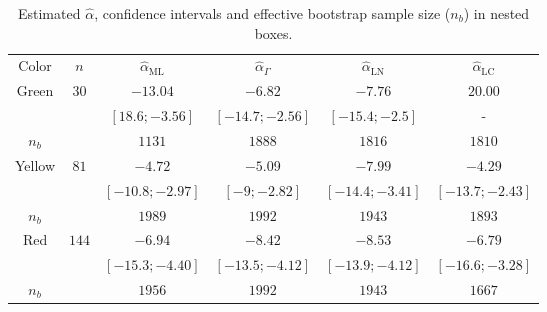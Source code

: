 \documentclass[twocolumn]{svjour3}
\begin{document}
\begin{table}[hbt]
\centering
\caption{Estimated $\widehat{\alpha}$, confidence intervals and effective bootstrap sample size ($n_b$) in nested boxes.}\label{ResultadosCorner} 
\begin{tabular}{c*5{c}}
	\toprule
	Color       &  $n$    &  $\widehat{\alpha}_{\text{{ML}}}$    &  $\widehat{\alpha}_{\Gamma}$  &  $\widehat{\alpha}_{\text{{LN}}}$ &  $\widehat{\alpha}_{\text{{LC}}}$\\
	\cmidrule(lr){1-6}
	Green       & $30$  & $-13.04$  & $-6.82$  & $-7.76$     &  $20.00$  \\
	&                   & $[18.6;-3.56]$ & $[-14.7;-2.56]$  & $[-15.4;-2.5]$ & -\\
	$n_{b}$    	&       &  $1131$         & $1888$            &  $1816$          &   $1810$       \\ \midrule
	Yellow     & $81$   & $-4.72$  & $-5.0$9   & $-7.99$     &  $-4.29$    \\
	&       & $[-10.8;-2.97]$ & $[-9;-2.82]$ & $[-14.4;-3.41]$ & $[-13.7;-2.43]$\\
	$n_{b}$    	&       & $1989$          &  $1992$         &   $1943$        &  $1893$        \\ \midrule
	Red        & $144$  & $-6.94$  & $-8.42$   & $-8.53$     &   $-6.79$\\
	&           & $[-15.3;-4.40]$ & $[-13.5;-4.12]$ & $[-13.9;-4.12]$ & $[-16.6;-3.28]$\\
	$n_{b}$    	&       & $1956$          &  $1992$         &  $1943$         & $1667$         \\ \midrule
	\bottomrule
\end{tabular}
\end{table} 
\end{document}
